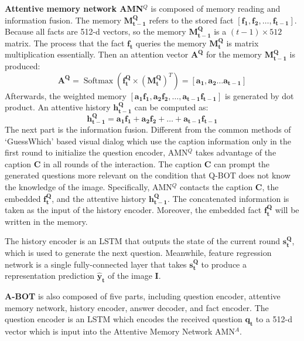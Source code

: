 \documentclass[review]{elsarticle}
\begin{document}
	\textbf{Attentive memory network AMN$^{Q}$} is composed of memory reading and information fusion. The memory $\mathbf{M^{Q}_{t-1}}$  refers to the stored fact $\left[\mathbf{f_{1}}, \mathbf{f_{2}}, \dots, \mathbf{f_{t-1}} \right]$. Because all facts are 512-d vectors, so the memory $\mathbf{M^{Q}_{t-1}}$ is a $(t-1) \times 512$ matrix. 
	The process that the fact $\mathbf{f_{t}}$ queries the memory $\mathbf{M^{Q}_{t}}$ is matrix multiplication essentially. Then an attention vector $\mathbf{A^{Q}}$ for the memory $\mathbf{M^{Q}_{t-1}}$ is produced:
	\begin{equation}
	\mathbf{A^{Q}}=\operatorname{Softmax}\left(\mathbf{f_{t}^{Q}} \times\left(\mathbf{M_{t}^{Q}}\right)^{T}\right)=\left[\mathbf{a_{1}}, \mathbf{a_{2}} \dots \mathbf{a_{t-1}}\right]
	\label{Eq1}
	\end{equation}
	Afterwards, the weighted memory $\left[\mathbf{a_{1}f_{1}}, \mathbf{a_{2}f_{2}}, \dots, \mathbf{a_{t-1}f_{t-1}} \right]$ is generated by dot product. An attentive history $\mathbf{h^{Q}_{t-1}}$ can be computed as:
	\begin{equation}
	\mathbf{h_{t-1}^{Q}}=\mathbf{a_{1} f_{1}}+\mathbf{a_{2} f_{2}}+\ldots+\mathbf{a_{t-1} f_{t-1}}
	\label{Eq2}
	\end{equation}
	The next part is the information fusion. Different from the common methods of `GuessWhich' based visual dialog which use the caption information only in the first round to initialize the question encoder, AMN$^{Q}$ takes advantage of the caption $\textbf{C}$ in all rounds of the interaction.
	The caption $\textbf{C}$ can prompt the generated questions more relevant on the condition that Q-BOT does not know the knowledge of the image. Specifically, AMN$^{Q}$ contacts the caption $\textbf{C}$, the embedded $\mathbf{f^{Q}_{t}}$, and the attentive history $\mathbf{h^{Q}_{t-1}}$. 
	The concatenated information is taken as the input of the history encoder. Moreover, the embedded fact $\mathbf{f^{Q}_{t}}$ will be written in the memory.
	
	The history encoder is an LSTM that outputs the state of the current round $\mathbf{s^{Q}_{t}}$, which is used to generate the next question. Meanwhile, feature regression network is a single fully-connected layer that takes $\mathbf{s^{Q}_{t}}$ to produce a representation prediction $\mathbf{\hat{y}_{t}}$ of the image $\textbf{I}$.
	
	\textbf{A-BOT} is also composed of five parts, including question encoder, attentive memory network, history encoder, answer decoder, and fact encoder. 
	The question encoder is an LSTM which encodes the received question $\mathbf{q_{t}}$ to a 512-d vector which is input into the Attentive Memory Network AMN$^{A}$.
	
\end{document}
